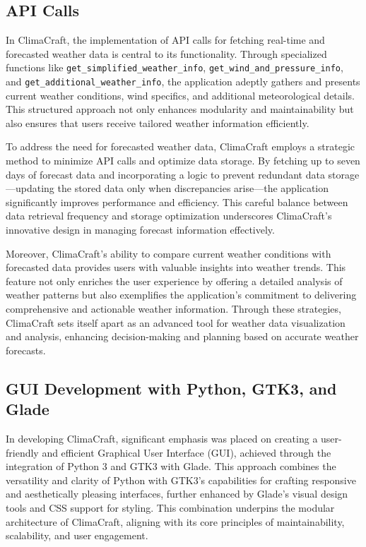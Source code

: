 \documentclass[sn-mathphys-num]{sn-jnl}%
\begin{document}
\subsection{API Calls}\label{sec3.1}

In ClimaCraft, the implementation of API calls for fetching real-time and forecasted weather data is central to its functionality. Through specialized functions like \texttt{get\_simplified\_weather\_info}, \texttt{get\_wind\_and\_pressure\_info}, and \texttt{get\_additional\_weather\_info}, the application adeptly gathers and presents current weather conditions, wind specifics, and additional meteorological details. This structured approach not only enhances modularity and maintainability but also ensures that users receive tailored weather information efficiently.

To address the need for forecasted weather data, ClimaCraft employs a strategic method to minimize API calls and optimize data storage. By fetching up to seven days of forecast data and incorporating a logic to prevent redundant data storage—updating the stored data only when discrepancies arise—the application significantly improves performance and efficiency. This careful balance between data retrieval frequency and storage optimization underscores ClimaCraft's innovative design in managing forecast information effectively.

Moreover, ClimaCraft's ability to compare current weather conditions with forecasted data provides users with valuable insights into weather trends. This feature not only enriches the user experience by offering a detailed analysis of weather patterns but also exemplifies the application's commitment to delivering comprehensive and actionable weather information. Through these strategies, ClimaCraft sets itself apart as an advanced tool for weather data visualization and analysis, enhancing decision-making and planning based on accurate weather forecasts.

\subsection{GUI Development with Python, GTK3, and Glade}\label{sec3.2}

In developing ClimaCraft, significant emphasis was placed on creating a user-friendly and efficient Graphical User Interface (GUI), achieved through the integration of Python 3 and GTK3 with Glade. This approach combines the versatility and clarity of Python with GTK3's capabilities for crafting responsive and aesthetically pleasing interfaces, further enhanced by Glade's visual design tools and CSS support for styling. This combination underpins the modular architecture of ClimaCraft, aligning with its core principles of maintainability, scalability, and user engagement.
\end{document}

